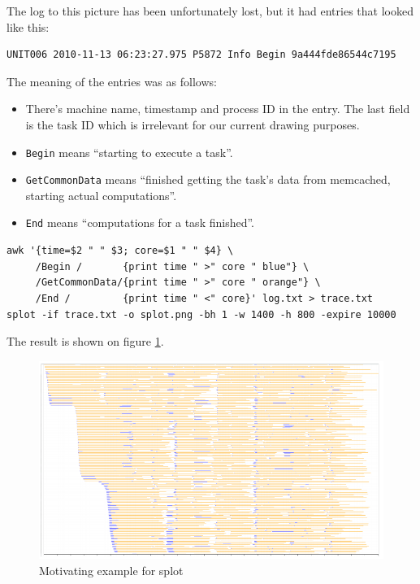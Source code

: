\documentclass{article}
\begin{document}
The log to this picture has been unfortunately lost, but it had entries that looked like this:

\begin{verbatim}
UNIT006 2010-11-13 06:23:27.975 P5872 Info Begin 9a444fde86544c7195
\end{verbatim}

The meaning of the entries was as follows:

\begin{itemize}
\item There's machine name, timestamp and process ID in the entry. The last field is the task ID which is irrelevant for our current drawing purposes.
\item \verb|Begin| means ``starting to execute a task''.
\item \verb|GetCommonData| means ``finished getting the task's data from memcached, starting actual computations''.
\item \verb|End| means ``computations for a task finished''.
\end{itemize}

\begin{verbatim}
awk '{time=$2 " " $3; core=$1 " " $4} \
     /Begin /       {print time " >" core " blue"} \
     /GetCommonData/{print time " >" core " orange"} \
     /End /         {print time " <" core}' log.txt > trace.txt
splot -if trace.txt -o splot.png -bh 1 -w 1400 -h 800 -expire 10000
\end{verbatim}

The result is shown on figure \ref{fig:splot-main-example}.

\begin{figure}
\center
\includegraphics[width=\textwidth]{pics/splot/splot-main-example.png}
\caption{Motivating example for splot}
\label{fig:splot-main-example}
\end{figure}
\end{document}
